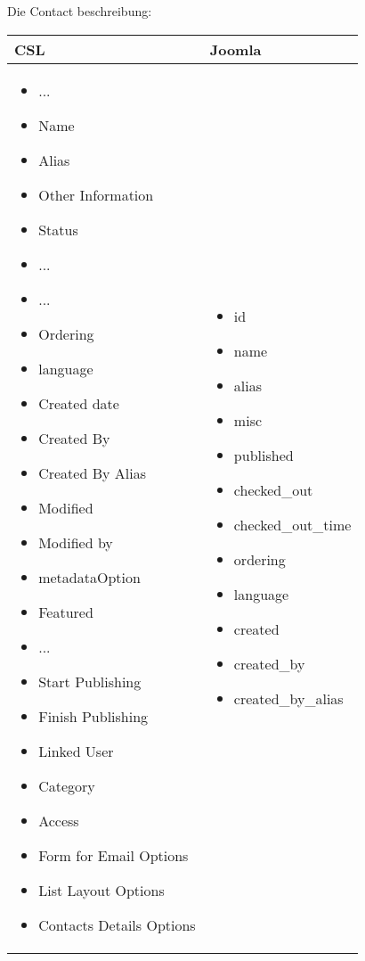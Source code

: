 Die Contact beschreibung:

\begin{minipage}{0.7\textwidth}
\begin{tabular}{|p{} | p{}|}
\hline
\textbf{CSL} & \textbf{Joomla} \\ 
\hline
\begin{itemize}
\item ...
\item  Name
\item  Alias
\item  Other Information
\item  Status
\item  ...
\item  ...
\item  Ordering
\item  language
\item  Created date
\item  Created By
\item  Created By Alias
\item  Modified
\item  Modified by
\item  metadataOption
\item  Featured
\item  ...
\item  Start Publishing
\item  Finish Publishing
\item  Linked User
\item  Category
\item  Access
\item  Form for Email Options
\item  List Layout Options
\item Contacts Details Options
\end{itemize}
 & 
\begin{itemize}
\item id
\item  name
\item  alias
\item   misc
\item  published
\item  checked\_out
\item  checked\_out\_time
\item  ordering
\item  language
\item  created
\item  created\_by
\item  created\_by\_alias

\end{itemize}
\end{tabular}
\end{minipage}
